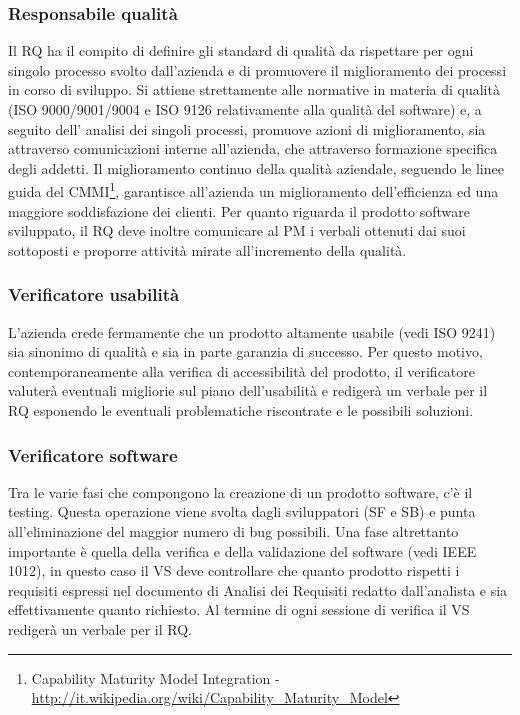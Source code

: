 \subsubsection{Responsabile qualit\`{a}}
Il RQ ha il compito di definire gli standard di qualit\`{a} da rispettare per ogni singolo processo
svolto dall\textquoteright{}azienda e di promuovere il miglioramento dei processi in corso di sviluppo.
Si attiene strettamente alle normative in materia di qualit\`{a} (ISO 9000/9001/9004
e ISO 9126 relativamente alla qualit\`{a} del software) e, a seguito dell\textquoteright{} analisi dei singoli
processi, promuove azioni di miglioramento, sia attraverso comunicazioni interne all\textquoteright{}azienda,
che attraverso formazione specifica degli addetti. Il miglioramento continuo
della qualit\`{a} aziendale, seguendo le linee guida del CMMI\footnote{Capability Maturity Model Integration - \url{http://it.wikipedia.org/wiki/Capability\_Maturity\_Model}}, garantisce all\textquoteright{}azienda un
miglioramento dell\textquoteright{}efficienza ed una maggiore soddisfazione dei clienti. Per quanto riguarda
il prodotto software sviluppato, il RQ deve inoltre comunicare al PM i verbali
ottenuti dai suoi sottoposti e proporre attivit\`{a} mirate all\textquoteright{}incremento della qualit\`{a}.

\subsubsection{Verificatore usabilit\`{a}}
L\textquoteright{}azienda crede fermamente che un prodotto altamente usabile (vedi ISO 9241) sia
sinonimo di qualit\`{a} e sia in parte garanzia di successo. Per questo motivo, contemporaneamente
alla verifica di accessibilit\`{a} del prodotto, il verificatore valuter\`{a} eventuali
migliorie sul piano dell\textquoteright{}usabilit\`{a} e rediger\`{a} un verbale per il RQ esponendo le eventuali problematiche riscontrate e le possibili soluzioni.

\subsubsection{Verificatore software}
Tra le varie fasi che compongono la creazione di un prodotto software, c\textquoteright{}\`{e} il testing.
Questa operazione viene svolta dagli sviluppatori (SF e SB) e punta all\textquoteright{}eliminazione del
maggior numero di bug possibili. Una fase altrettanto importante \`{e} quella della verifica
e della validazione del software (vedi IEEE 1012), in questo caso il VS deve controllare
che quanto prodotto rispetti i requisiti espressi nel documento di Analisi dei Requisiti
redatto dall\textquoteright{}analista e sia effettivamente quanto richiesto. Al termine di ogni sessione di verifica il VS rediger\`{a} un verbale per il RQ.

